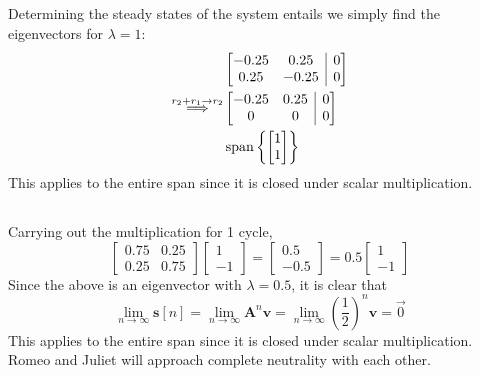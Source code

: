 \documentclass[]{article}
\numberwithin{equation}{section}
\newcommand{\Span}[1]{\operatorname{span}\left\lbrace{#1}\right\rbrace}
\begin{document}
\subsection{}

Determining the steady states of the system entails we simply find the eigenvectors for \(\lambda = 1\): 
\begin{align}
	&\left[\begin{array}{@{}cc|c@{}}
	-0.25 & 0.25 & 0 \\
	0.25 & -0.25 & 0
	\end{array}\right] \\
	\overset{r_2 + r_1 \to r_2}{\Longrightarrow} &\left[\begin{array}{@{}cc|c@{}}
	-0.25 & 0.25 & 0 \\
	0 & 0 & 0
	\end{array}\right] \\
	&\Span{\begin{bmatrix}
		1 \\
		1
		\end{bmatrix}}
\end{align}
This applies to the entire span since it is closed under scalar multiplication. 

\subsection{}

Carrying out the multiplication for 1 cycle, 
\begin{equation}
	\begin{bmatrix}
	0.75 & 0.25 \\
	0.25 & 0.75
	\end{bmatrix}
	\begin{bmatrix}
	1 \\
	-1
	\end{bmatrix}
	=
	\begin{bmatrix}
	0.5 \\
	-0.5
	\end{bmatrix}
	=
	0.5\begin{bmatrix}
	1 \\
	-1
	\end{bmatrix}
\end{equation}
Since the above is an eigenvector with \(\lambda = 0.5\), it is clear that 
\begin{equation}
	\lim_{n \to \infty} \mathbf{s}[n] = \lim_{n \to \infty} \mathbf{A}^n \mathbf{v} = \lim_{n \to \infty} \left(\frac{1}{2}\right)^n \mathbf{v} = \vec{0}
\end{equation}
This applies to the entire span since it is closed under scalar multiplication. 
Romeo and Juliet will approach complete neutrality with each other. 
\end{document}
